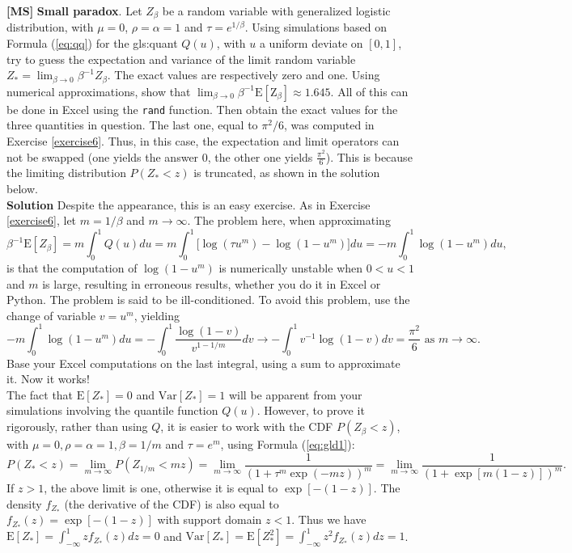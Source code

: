 \documentclass[10pt]{article}
\begin{document}
\begin{Exercise}\label{exercise7}{\bf [MS]}
 {\bf Small paradox}. Let $Z_\beta$ be a random variable with generalized logistic distribution, with $\mu=0$, $\rho=\alpha=1$ and $\tau=e^{1/\beta}$.
Using simulations based on Formula (\ref{eq:qq}) for the \gls{gls:quant} $Q(u)$, with $u$ a uniform deviate on $[0,1]$, try to guess the expectation and variance of the limit random variable $Z_*=\lim_{\beta\rightarrow 0}\beta^{-1}Z_{\beta}$. The exact values are respectively zero and one. Using numerical approximations, show that $\lim_{\beta\rightarrow 0} \beta^{-1}\mbox{E}[\mbox{Z}_{\beta}]\approx 1.645$. All of this can be done in Excel using the \texttt{rand} function. Then obtain the exact values for the three quantities in question. The last one, equal to $\pi^2/6$, was computed in Exercise \ref{exercise6}. Thus, in this case, the expectation and limit operators can not be swapped
(one yields the answer $0$, the other one yields $\frac{\pi^2}{6}$). This is because the limiting distribution  $P(Z_*<z)$
is \textcolor{index}{truncated}, as shown in the solution below. \vspace{1ex} \\
{\bf Solution} Despite the appearance, this is an easy exercise. As in Exercise \ref{exercise6}, let  $m=1/\beta$ and $m\rightarrow \infty$. The problem here, when approximating
$$\beta^{-1}\mbox{E}[Z_{\beta}]=m\int_0^1 Q(u)du =m\int_0^1\Big[\log(\tau u^m) - \log(1-u^m)\Big]du
=-m\int_0^1\log(1-u^m)du,$$
is that the computation of $\log(1-u^m)$ is \textcolor{index}{numerically unstable} \cite{num}
when $0<u<1$ and $m$ is large, resulting in erroneous results, whether you do it in Excel or Python. The problem is said to be ill-conditioned. To avoid this problem, use the change of variable $v=u^m$, yielding
$$-m\int_0^1  \log(1-u^m) du= -\int_0^1\frac{\log(1-v)}{v^{1-1/m}}dv \rightarrow -\int_0^1 v^{-1}\log(1-v)dv = \frac{\pi^2}{6} \mbox{ as } m\rightarrow\infty.$$
Base your Excel computations on the last integral, using a sum to approximate it. Now it works! \vspace{1ex} \\
The fact that $\mbox{E}[Z_*]=0$ and $\mbox{Var}[Z_*]=1$ will be apparent from your simulations involving the quantile function $Q(u)$. However, to prove it rigorously, rather than using $Q$, it is easier to work with the CDF $P(Z_\beta<z)$, with $\mu=0,\rho=\alpha=1,\beta=1/m$ and $\tau=e^m$, using Formula (\ref{eq:gld1}):
$$P(Z_*<z)=\lim_{m\rightarrow\infty}P(Z_{1/m}<mz)=\lim_{m\rightarrow\infty}\frac{1}{(1+\tau^m\exp(-mz))^m}
=\lim_{m\rightarrow\infty}\frac{1}{(1+\exp[m(1-z)])^m}.$$
If $z>1$, the above limit is one, otherwise it is equal to $\exp[-(1-z)]$. The density $f_{Z_*}$ (the derivative of the CDF) is also equal to
$f_{Z_*}(z)=\exp[-(1-z)]$ with support domain $z<1$. Thus we have $\mbox{E}[Z_*]=\int_{-\infty}^1 z f_{Z_*}(z) dz =0$ and
$\mbox{Var}[Z_*]=\mbox{E}[Z_*^2]=\int_{-\infty}^1 z^2  f_{Z_*}(z)dz= 1$.
\end{Exercise}
\end{document}

